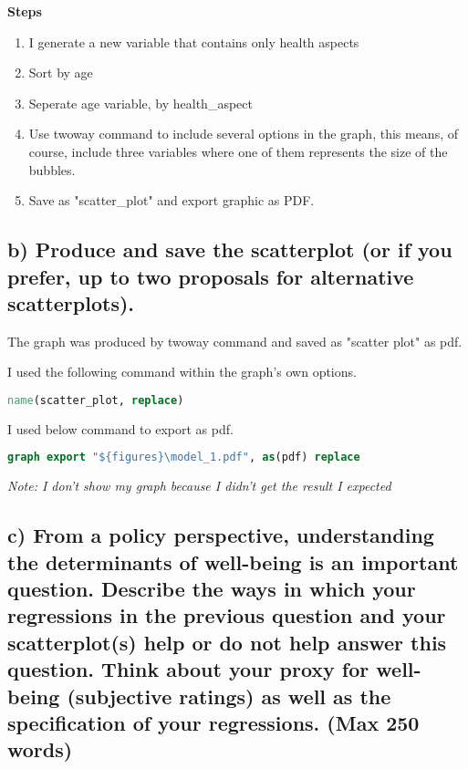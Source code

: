\documentclass[12pt,a4paper]{article}
\begin{document}
\textbf{Steps}

\begin{enumerate}
	\item I generate a new variable that contains only health aspects
	\item Sort by age
	\item Seperate age variable, by health_aspect
	\item Use twoway command to include several options in the graph, this means, of course, include three variables where one of them represents the size of the bubbles.
	\item Save as "scatter_plot" and export graphic as PDF.
\end{enumerate}

	\subsection*{\normalsize{b) Produce and save the scatterplot (or if you prefer, up to two proposals for alternative scatterplots).}}
	
	The graph was produced by twoway command and saved as "scatter plot" as pdf.
	
	I used the following command within the graph's own options.
	
	\begin{lstlisting}[language=Stata]
	name(scatter_plot, replace)
	\end{lstlisting}

	I used below command to export as pdf.
	
	\begin{lstlisting}[language=Stata]
	graph export "${figures}\model_1.pdf", as(pdf) replace
	\end{lstlisting}
	
	\textit{Note: I don't show my graph because I didn't get the result I expected}
	
	\subsection*{\normalsize{c) From a policy perspective, understanding the determinants of well-being is an important question. Describe the ways in which your regressions in the previous question and your scatterplot(s) help or do not help answer this question. Think about your proxy for well-being (subjective ratings) as well as the specification of your regressions. (Max 250 words)}}
	
\end{document}

